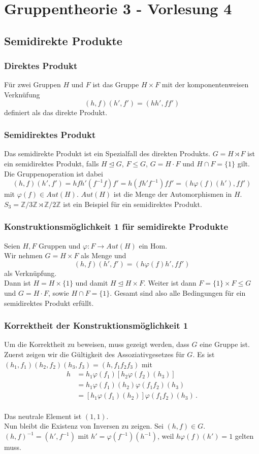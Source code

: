 \documentclass[12pt, german]{article}
\newcommand{\Z}{\mathbb{Z}}
\begin{document}
	\section{Gruppentheorie 3 - Vorlesung 4}
	\subsection{Semidirekte Produkte}
	\subsubsection{Direktes Produkt}
	Für zwei Gruppen $H$ und $F$ ist das Gruppe $H \times F$ mit  der komponentenweisen Verknüfung $$(h,f)(h', f') = (hh', ff')$$ definiert als das direkte Produkt.
	
	\subsubsection{Semidirektes Produkt}
	Das semidirekte Produkt ist ein Spezialfall des direkten Produkts.
	$G = H \rtimes F$ ist ein semidirektes Produkt, falls $H \trianglelefteq G$, $F \leq G$,  $G = H\cdot F$ und $H \cap F = \{1\}$ gilt. 
	Die Gruppenoperation ist dabei 
	$$(h,f)(h',f') = hfh'(f^{-1}f)f' = h(fh'f^{-1})ff'  = (h\varphi(f)(h'), ff')$$
	mit $\varphi(f) \in Aut(H)$.
	$Aut(H)$ ist die Menge der Automorphismen in $H$.
	\newline
	$S_3 = \Z/3\Z \rtimes \Z/2\Z$ ist ein Beispiel für ein semidirektes Produkt.
	\subsubsection{Konstruktionsmöglichkeit 1 für semidirekte Produkte}
	Seien $H, F$ Gruppen und $\varphi: F\to Aut(H)$ ein Hom. \\ 
	Wir nehmen $G = H \times F$ als Menge und $$ (h,f)(h',f') = (h\varphi(f)h', ff')$$ als Verknüpfung.\\
	Dann ist $H= H \times \{1\}$ und damit $H \trianglelefteq H \times F$. 
	Weiter ist dann $F = \{1\} \times F \leq G$ und $G= H\cdot F$, sowie $H\cap F = \{1\}$.
	Gesamt sind also alle Bedingungen für ein semidirektes Produkt erfüllt.
	
	\subsubsection{Korrektheit der Konstruktionsmöglichkeit 1}
	Um die Korrektheit zu beweisen, muss gezeigt werden, dass $G$ eine Gruppe ist.
	Zuerst zeigen wir die Gültigkeit des Assoziativgesetzes für $G$.
	Es ist $(h_1, f_1)(h_2, f_2)(h_3, f_3) = (h, f_1f_2f_3)$ mit 
	\begin{align*}
		h&=h_1\varphi(f_1)[h_2\varphi(f_2)(h_3)] \\
		&=h_1\varphi(f_1)(h_2)\varphi(f_1f_2)(h_3)\\
		&=[h_1\varphi(f_1)(h_2)]\varphi(f_1f_2)(h_3)\, .
	\end{align*} 
	\\ 
	Das neutrale Element ist $(1,1)$.\\
	Nun bleibt die Existenz von Inversen zu zeigen.
	Sei $(h,f)\in G$. $(h, f)^{-1} = (h', f^{-1})$ mit $h' = \varphi(f^{-1})(h^{-1})$, weil $h\varphi(f)(h')= 1$ gelten muss.
		
\end{document}
